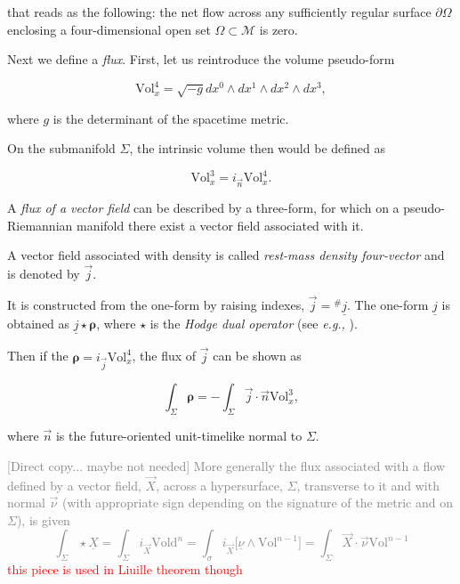 that reads as the following: the net flow across any sufficiently regular surface $\partial\Omega$ enclosing a four-dimensional open set $\Omega\subset\mathcal{M}$ is zero.

Next we define a \textit{flux}. First, let us reintroduce the volume pseudo-form

\begin{equation}
\text{Vol}_x ^4 = \sqrt{-g}dx^0 \wedge dx^1 \wedge dx^2 \wedge dx^3,
\end{equation}

where $g$ is the determinant of the spacetime metric. 

On the submanifold $\Sigma$, the intrinsic volume then would be defined as 

\begin{equation}
\text{Vol}_x ^3 = i_{\vec{n}} \text{Vol}_x ^4.
\end{equation}

A \textit{flux of a vector field} can be described by a three-form, for which on a pseudo-Riemannian manifold there exist a vector field associated with it.

A vector field associated with density is called \textit{rest-mass density four-vector} and is denoted by $\vec{j}$.

It is constructed from the one-form by raising indexes, $\vec{j} = {^{\#}\underline{j}}$. 
The one-form $\underline{j}$ is obtained as $\underline{j}\star\boldsymbol{\rho}$, where $\star$ is the \textit{Hodge dual operator} (see \textit{e.g.,} \cite{Frankel:1982dva}). 

Then if the $\boldsymbol{\rho} = i_{\vec{j}}\text{Vol}_x ^4$, the flux of $\vec{j}$ can be shown as 

\begin{equation}
\int_{\Sigma} \boldsymbol{\rho} = - \int_{\Sigma}\vec{j}\cdot\vec{n}\text{Vol}_x ^3,
\end{equation}

where $\vec{n}$ is the future-oriented unit-timelike normal to $\Sigma$.

\textcolor{gray}{
    [Direct copy... maybe not needed] More generally the flux associated with a flow defined by a vector field, $\vec{X}$, across a hypersurface, $\Sigma$, transverse to it and with normal $\vec{\nu}$ (with appropriate sign depending on the signature of the metric and on $\Sigma$), is given 
    \begin{equation}
    \int_{\Sigma} \star\underline{X} = \int_{\Sigma}i_{\vec{X}}\text{Vold}^n = \int_{\sigma}i_{\vec{X}}\big[\underline{\nu}\wedge\text{Vol}^{n-1}\big] = \int_{\Sigma}\vec{X}\cdot\vec{\nu}\text{Vol}^{n-1}
    \label{eq:theory:flux_of_flow}
    \end{equation}
}
\textcolor{red}{this piece is used in Liuille theorem though}

